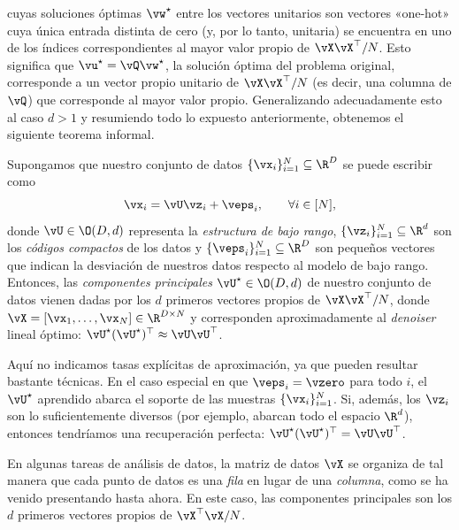 \documentclass[../../book-main.tex]{subfiles}
\begin{document}
cuyas soluciones óptimas \(\vw^{\star}\) entre los vectores unitarios son
vectores «one-hot» cuya única entrada distinta de cero (y, por lo tanto, unitaria) se encuentra en uno de
los índices correspondientes al mayor valor propio de
\(\vX\vX^{\top}/N\). Esto significa que \(\vu^\star =
\vQ\vw^\star\), la solución óptima del problema original,
corresponde a un vector propio unitario de \(\vX\vX^{\top}/N\) (es decir,
una columna de \(\vQ\)) que corresponde al mayor valor propio.
Generalizando adecuadamente esto al caso \(d > 1\) y resumiendo todo
lo expuesto anteriormente, obtenemos el siguiente teorema informal.
\begin{theorem}\label{thm:pca}
    Supongamos que nuestro conjunto de datos \(\{\vx_{i}\}_{i = 1}^{N} \subseteq
    \R^{D}\) se puede escribir como
    \begin{equation}
        \vx_{i} = \vU\vz_{i} + \veps_{i}, \qquad \forall i \in [N],
    \end{equation}
    donde \(\vU \in \O(D, d)\) representa la \textit{estructura de bajo rango},
    \(\{\vz_{i}\}_{i = 1}^{N} \subseteq \R^{d}\) son los \textit{códigos compactos}
    de los datos y \(\{\veps_{i}\}_{i = 1}^{N} \subseteq \R^{D}\) son pequeños
    vectores que indican la desviación de nuestros datos respecto al modelo de bajo rango. Entonces,
    las \textit{componentes principales} \(\vU^{\star} \in \O(D, d)\) de nuestro
    conjunto de datos vienen dadas por los \(d\) primeros vectores propios de \(\vX\vX^{\top}/N\),
    donde \(\vX = [\vx_{1}, \dots, \vx_{N}] \in \R^{D \times N}\) y
    corresponden aproximadamente al \textit{denoiser} lineal óptimo:
    \(\vU^{\star}(\vU^{\star})^{\top} \approx \vU\vU^{\top}\).
\end{theorem}
Aquí no indicamos tasas explícitas de aproximación, ya que pueden resultar bastante
técnicas. En el caso especial en que \(\veps_{i} = \vzero\) para todo \(i\), el
\(\vU^{\star}\) aprendido abarca el soporte de las muestras \(\{\vx_{i}\}_{i
= 1}^{N}\). Si, además, los \(\vz_{i}\) son lo suficientemente diversos (por ejemplo,
abarcan todo el espacio \(\R^{d}\)), entonces tendríamos una recuperación perfecta:
\(\vU^{\star}(\vU^{\star})^{\top} = \vU\vU^{\top}\).

\begin{remark}
    En algunas tareas de análisis de datos, la matriz de datos \(\vX\) se organiza
    de tal manera que cada punto de datos es una \textit{fila} en lugar de una
    \textit{columna}, como se ha venido presentando hasta ahora. En este caso, las componentes principales
    son los \(d\) primeros vectores propios de \(\vX^{\top}\vX/N\).
\end{remark}
\end{document}
